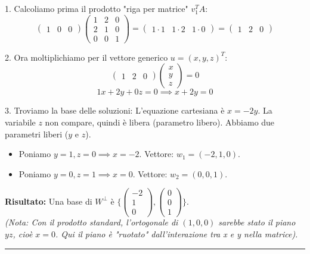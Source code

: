 \documentclass[10pt,a4paper]{article}
\begin{document}
1. Calcoliamo prima il prodotto "riga per matrice" $v_1^T A$:
\[ \begin{pmatrix} 1 & 0 & 0 \end{pmatrix} \begin{pmatrix} 1 & 2 & 0 \\ 2 & 1 & 0 \\ 0 & 0 & 1 \end{pmatrix} = \begin{pmatrix} 1\cdot1 & 1\cdot2 & 1\cdot0 \end{pmatrix} = \begin{pmatrix} 1 & 2 & 0 \end{pmatrix} \]

2. Ora moltiplichiamo per il vettore generico $u = (x,y,z)^T$:
\[ \begin{pmatrix} 1 & 2 & 0 \end{pmatrix} \begin{pmatrix} x \\ y \\ z \end{pmatrix} = 0 \]
\[ 1x + 2y + 0z = 0 \implies x + 2y = 0 \]

3. Troviamo la base delle soluzioni:
L'equazione cartesiana è $x = -2y$. La variabile $z$ non compare, quindi è libera (parametro libero).
Abbiamo due parametri liberi ($y$ e $z$).
\begin{itemize}
    \item Poniamo $y=1, z=0 \implies x=-2$. Vettore: $w_1 = (-2, 1, 0)$.
    \item Poniamo $y=0, z=1 \implies x=0$. Vettore: $w_2 = (0, 0, 1)$.
\end{itemize}

\textbf{Risultato:} Una base di $W^\perp$ è $\{ \begin{pmatrix} -2 \\ 1 \\ 0 \end{pmatrix}, \begin{pmatrix} 0 \\ 0 \\ 1 \end{pmatrix} \}$.
\\ \textit{(Nota: Con il prodotto standard, l'ortogonale di $(1,0,0)$ sarebbe stato il piano $yz$, cioè $x=0$. Qui il piano è "ruotato" dall'interazione tra x e y nella matrice).}

\vspace{0.4cm}
\hrule
\vspace{0.4cm}
\end{document}
